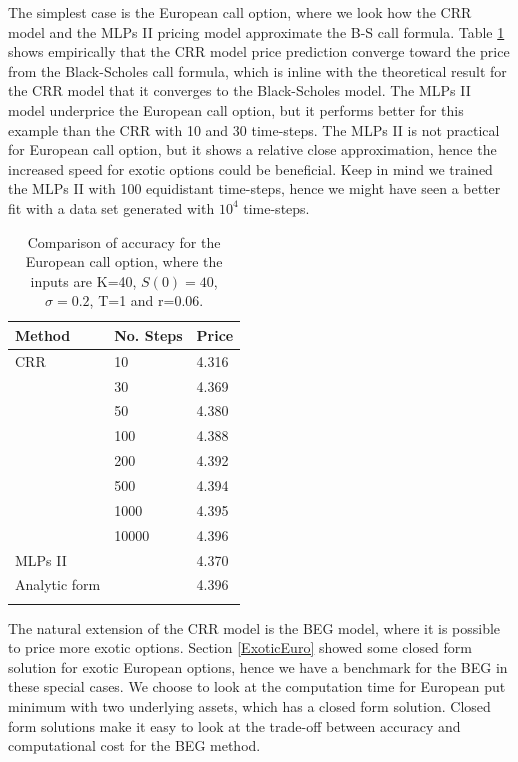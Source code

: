 The simplest case is the European call option, where we look how the CRR model and the MLPs II pricing model approximate the B-S call formula. Table \ref{tab:EuroCall} shows empirically that the CRR model price prediction converge toward the price from the Black-Scholes call formula, which is inline with the theoretical result for the CRR model that it converges to the Black-Scholes model. The MLPs II model underprice the European call option, but it performs better for this example than the CRR with 10 and 30 time-steps. The MLPs II is not practical for European call option, but it shows a relative close approximation, hence the increased speed for exotic options could be beneficial. Keep in mind we trained the MLPs II with 100 equidistant time-steps, hence we might have seen a better fit with a data set generated with $10^4$ time-steps.\\

\begin{table}[th]
\caption{Comparison of accuracy for the European call option, where the inputs are K=40, $S(0)=40$, $\sigma=0.2$, T=1 and r=0.06.}
\label{tab:EuroCall}
\centering
\begin{tabular}{l l l}
\toprule
\textbf{Method} & \textbf{No. Steps} & \textbf{Price} \\
\midrule
CRR & 10 & 4.316\\
& 30 & 4.369\\
& 50 & 	4.380\\
& 100 & 4.388\\
& 200 & 4.392\\
& 500 & 4.394\\
& 1000 & 4.395\\
& 10000 & 4.396\\
MLPs II & & 4.370\\
Analytic form & & 4.396\\
\bottomrule\\
\end{tabular}
\end{table}

The natural extension of the CRR model is the BEG model, where it is possible to price more exotic options. Section \ref{ExoticEuro} showed some closed form solution for exotic European options, hence we have a benchmark for the BEG in these special cases. We choose to look at the computation time for European put minimum with two underlying assets, which has a closed form solution. Closed form solutions make it easy to look at the trade-off between accuracy and computational cost for the BEG method. \\

